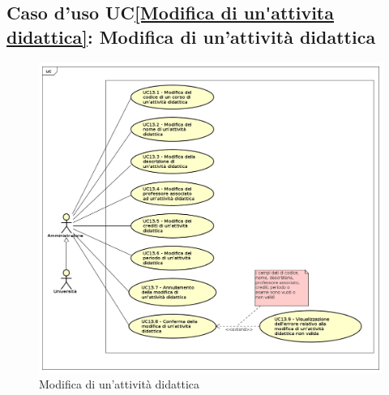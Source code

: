 \subsection{Caso d'uso UC\ref{Modifica di un'attivita didattica}: Modifica di un'attività didattica}
\begin{figure} [H]
	\centering
	\includegraphics[scale=0.45]{./img/UseCaseDiagram013.png}
	\caption{Modifica di un'attività didattica}\label{}
\end{figure}
